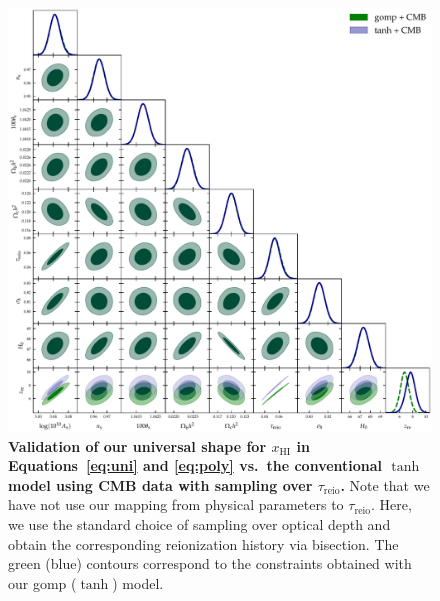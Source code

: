 \documentclass[12pt]{article}
\newcommand{\HI}{\mathrm{HI}}
\newcommand{\reio}{\mathrm{reio}}
\begin{document}
\begin{figure}
\centering
\includegraphics[width=\linewidth]{figs/gomp_tanh_triangle_tau.pdf}
\caption{\textbf{\boldmath Validation of our universal shape for $x_\HI$ in
Equations~\eqref{eq:uni} and \eqref{eq:poly} vs.\ the conventional $\tanh$ model using CMB data
with sampling over $\tau_\reio$.}
Note that we have not use our mapping from physical parameters to
$\tau_\reio$.
Here, we use the standard choice of sampling over optical depth and
obtain the corresponding reionization history via bisection.
The green (blue) contours correspond to the constraints obtained with
our gomp ($\tanh$) model.}
\label{fig:tg}
\end{figure}



\end{document}
